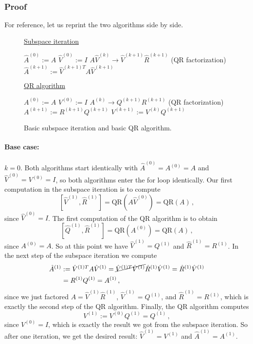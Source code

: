 \documentclass[letterpaper,10pt]{article}
\begin{document}
\subsubsection*{Proof}
For reference, let us reprint the two algorithms side by side.
\begin{figure}[ht]
\begin{minipage}[t]{0.5\linewidth}

\underline{Subspace iteration}
\begin{algorithmic}
\STATE $\hat A^{(0)}:=A$
\STATE $\hat V^{(0)}:=I$
\STATE $A\hat V^{(k)}\rightarrow\hat V^{(k+1)}\hat R^{(k+1)}$ (QR factorization)
\STATE $\hat A^{(k+1)}:=\hat V^{(k+1)T}A\hat V^{(k+1)}$
\ENDFOR
\end{algorithmic}

\end{minipage}
\begin{minipage}[t]{0.5\linewidth}

\underline{QR algorithm}
\begin{algorithmic}
\STATE $A^{(0)}:=A$
\STATE $V^{(0)}:=I$
\STATE $A^{(k)}\rightarrow Q^{(k+1)}R^{(k+1)}$ (QR factorization)
\STATE $A^{(k+1)}:=R^{(k+1)}Q^{(k+1)}$
\STATE $V^{(k+1)}:=V^{(k)}Q^{(k+1)}$
\ENDFOR
\end{algorithmic}

\end{minipage}
\caption{Basic subspace iteration and basic QR algorithm.}
\end{figure}

\paragraph*{Base case:} $k=0$. Both algorithms start identically with $\hat
A^{(0)}=A^{(0)}=A$ and $\hat V^{(0)}=V^{(0)}=I$, so both algorithms enter the
for loop identically. Our first computation in the subspace iteration is to
compute
\[
[\hat V^{(1)},\hat R^{(1)}]=\mathrm{QR}(A\hat V^{(0)})=\mathrm{QR}(A)\,,
\]
since $\hat V^{(0)}=I$. The first computation of the QR algorithm is to obtain
\[
[\hat Q^{(1)},\hat R^{(1)}]=\mathrm{QR}(A^{(0)})=\mathrm{QR}(A)\,,
\]
since $A^{(0)}=A$. So at this point we have $\hat V^{(1)}=Q^{(1)}$ and $\hat
R^{(1)}=R^{(1)}$. In the next step of the subspace iteration we compute
\begin{align*}
\hat A^{(1)}&:=\hat V^{(1)T}A\hat V^{(1)}
=\cancel{\hat V^{(1)T}\hat V^{(1)}}\hat R^{(1)}\hat V^{(1)}
=\hat R^{(1)}\hat V^{(1)}\\
&=R^{(1)}Q^{(1)}=A^{(1)}\,,
\end{align*}
since we just factored $A=\hat V^{(1)}\hat R^{(1)}$, $\hat V^{(1)}=Q^{(1)}$,
and $\hat R^{(1)}=R^{(1)}$, which is exactly the second step of the QR
algorithm. Finally, the QR algorithm computes
\[
V^{(1)}:=V^{(0)}Q^{(1)}=Q^{(1)}\,,
\]
since $V^{(0)}=I$, which is exactly the result we got from the subspace
iteration. So after one iteration, we get the desired result: $\hat
V^{(1)}=V^{(1)}$ and $\hat A^{(1)}=A^{(1)}$.
\end{document}
